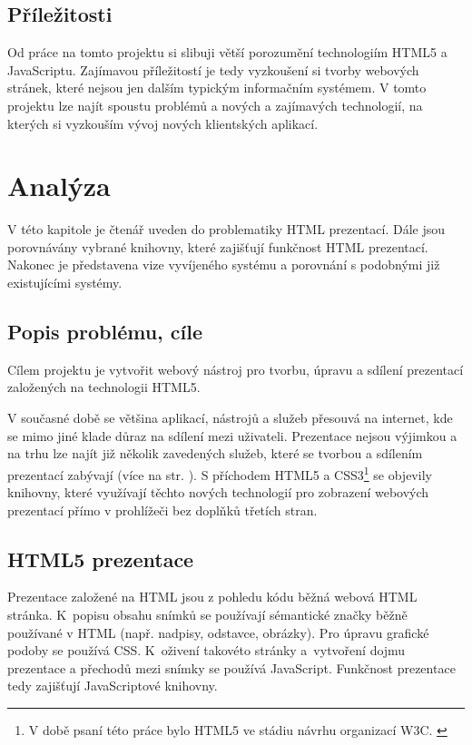\documentclass[11pt,twoside,a4paper]{book}
\newcommand*{\nom}[2]{#1 \nomenclature{#1}{#2}} 			%
\begin{document}
\section{Příležitosti}
Od práce na tomto projektu si slibuji větší porozumění technologiím HTML5 a JavaScriptu. Zajímavou příležitostí je tedy vyzkoušení si tvorby webových stránek, které nejsou jen dalším typickým informačním systémem. V tomto projektu lze najít spoustu problémů a nových a zajímavých technologií, na kterých si vyzkouším vývoj nových klientských aplikací.






\chapter{Analýza}
V této kapitole je čtenář uveden do problematiky \nom{HTML}{HyperText Markup Language} prezentací. Dále jsou porovnávány vybrané knihovny, které zajišťují funkčnost HTML prezentací. Nakonec je představena vize vyvíjeného systému a porovnání s podobnými již existujícími systémy.

\section{Popis problému, cíle}
Cílem projektu je vytvořit webový nástroj pro tvorbu, úpravu a sdílení prezentací založených na technologii HTML5.

V současné době se většina aplikací, nástrojů a služeb přesouvá na internet, kde se mimo jiné klade důraz na sdílení mezi uživateli. Prezentace nejsou výjimkou a na trhu lze najít již několik zavedených služeb, které se tvorbou a sdílením prezentací zabývají (více na str. \pageref{chap:existujiciSystemy}). S příchodem HTML5 a CSS3\footnote{V době psaní této práce bylo HTML5 ve stádiu návrhu organizací W3C. \cite{html5-2014}} se objevily knihovny, které využívají těchto nových technologií pro zobrazení webových prezentací přímo v prohlížeči bez doplňků třetích stran. 



\section{HTML5 prezentace}
Prezentace založené na HTML jsou z pohledu kódu běžná webová HTML stránka. K~popisu obsahu snímků se používají sémantické značky běžně používané v HTML (např. nadpisy, odstavce, obrázky). Pro úpravu grafické podoby se používá CSS. K~oživení takovéto stránky a~vytvoření dojmu prezentace a přechodů mezi snímky se používá JavaScript. Funkčnost prezentace tedy zajišťují JavaScriptové knihovny.
\end{document}
